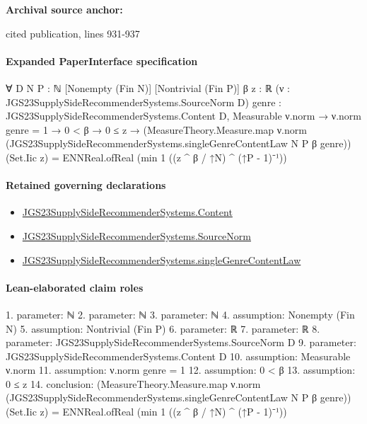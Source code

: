 \documentclass[10pt]{article}
\begin{document}
\textbf{Archival source anchor:} {\footnotesize\raggedright cited publication, lines 931-\allowbreak{}937\par}
\paragraph{Expanded PaperInterface specification}
\begin{ReviewVerbatim}
∀ {D N P : ℕ} [Nonempty (Fin N)] [Nontrivial (Fin P)] {β z : ℝ} (ν : JGS23SupplySideRecommenderSystems.SourceNorm D)
  {genre : JGS23SupplySideRecommenderSystems.Content D},
  Measurable ν.norm →
    ν.norm genre = 1 →
      0 < β →
        0 ≤ z →
          (MeasureTheory.Measure.map ν.norm (JGS23SupplySideRecommenderSystems.singleGenreContentLaw N P β genre))
              (Set.Iic z) =
            ENNReal.ofReal (min 1 ((z ^ β / ↑N) ^ (↑P - 1)⁻¹))
\end{ReviewVerbatim}

\paragraph{Retained governing declarations}
\begin{itemize}\raggedright
\item \hyperlink{governing-declaration-367305fda50f0ada}{JGS23\allowbreak{}Supply\allowbreak{}Side\allowbreak{}Recommender\allowbreak{}Systems.\allowbreak{}Content}
\item \hyperlink{governing-declaration-6141339a5d3412d9}{JGS23\allowbreak{}Supply\allowbreak{}Side\allowbreak{}Recommender\allowbreak{}Systems.\allowbreak{}Source\allowbreak{}Norm}
\item \hyperlink{governing-declaration-205216ea3d333b14}{JGS23\allowbreak{}Supply\allowbreak{}Side\allowbreak{}Recommender\allowbreak{}Systems.\allowbreak{}single\allowbreak{}Genre\allowbreak{}Content\allowbreak{}Law}
\end{itemize}
\paragraph{Lean-elaborated claim roles}\begin{ReviewVerbatim}
1. parameter: ℕ
2. parameter: ℕ
3. parameter: ℕ
4. assumption: Nonempty (Fin N)
5. assumption: Nontrivial (Fin P)
6. parameter: ℝ
7. parameter: ℝ
8. parameter: JGS23SupplySideRecommenderSystems.SourceNorm D
9. parameter: JGS23SupplySideRecommenderSystems.Content D
10. assumption: Measurable ν.norm
11. assumption: ν.norm genre = 1
12. assumption: 0 < β
13. assumption: 0 ≤ z
14. conclusion: (MeasureTheory.Measure.map ν.norm (JGS23SupplySideRecommenderSystems.singleGenreContentLaw N P β genre)) (Set.Iic z) =
  ENNReal.ofReal (min 1 ((z ^ β / ↑N) ^ (↑P - 1)⁻¹))
\end{ReviewVerbatim}
\end{document}
